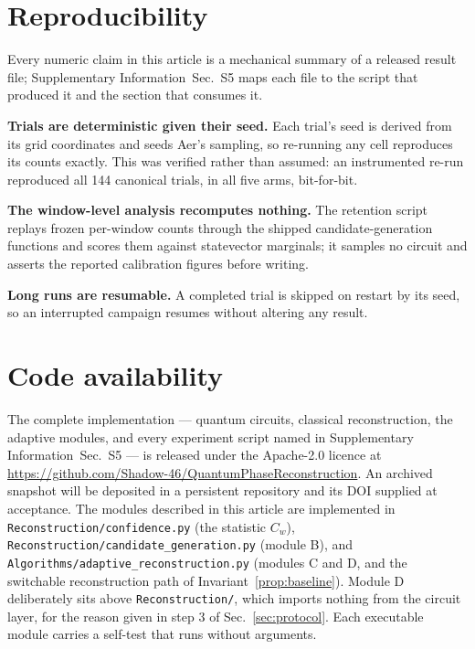 \documentclass[final,5p,times,longtitle]{elsarticle}
\newcommand{\SI}{Supplementary Information}
\newcommand{\SIartifacts}{\SI{}~Sec.~S5}
\newcommand{\Cw}{C_w}
\begin{document}
\section*{Reproducibility}

Every numeric claim in this article is a mechanical summary of a released
result file; \SIartifacts{} maps each file to the script that produced it
and the section that consumes it.

\textbf{Trials are deterministic given their seed.} Each trial's seed is
derived from its grid coordinates and seeds Aer's sampling, so re-running
any cell reproduces its counts exactly. This was verified rather than
assumed: an instrumented re-run reproduced all 144 canonical trials, in all
five arms, bit-for-bit.

\textbf{The window-level analysis recomputes nothing.} The retention script
replays frozen per-window counts through the shipped candidate-generation
functions and scores them against statevector marginals; it samples no
circuit and asserts the reported calibration figures before writing.

\textbf{Long runs are resumable.} A completed trial is skipped on restart by
its seed, so an interrupted campaign resumes without altering any result.

\section*{Code availability}
\begin{sloppypar}
The complete implementation --- quantum circuits, classical reconstruction,
the adaptive modules, and every experiment script named in \SIartifacts{}
--- is released under the Apache-2.0 licence at
\url{https://github.com/Shadow-46/QuantumPhaseReconstruction}. An archived
snapshot will be deposited in a persistent repository and its DOI supplied
at acceptance. The modules described in this article are implemented in
\texttt{Reconstruction/\allowbreak{}confidence.py} (the statistic $\Cw$),
\texttt{Reconstruction/\allowbreak{}candidate\_\allowbreak{}generation.py}
(module B), and
\texttt{Algorithms/\allowbreak{}adaptive\_\allowbreak{}reconstruction.py}
(modules C and D, and the switchable reconstruction path of
Invariant~\ref{prop:baseline}). Module D deliberately sits above
\texttt{Reconstruction/}, which imports nothing from the circuit layer, for
the reason given in step 3 of Sec.~\ref{sec:protocol}. Each executable
module carries a self-test that runs without arguments.
\end{sloppypar}
\end{document}

